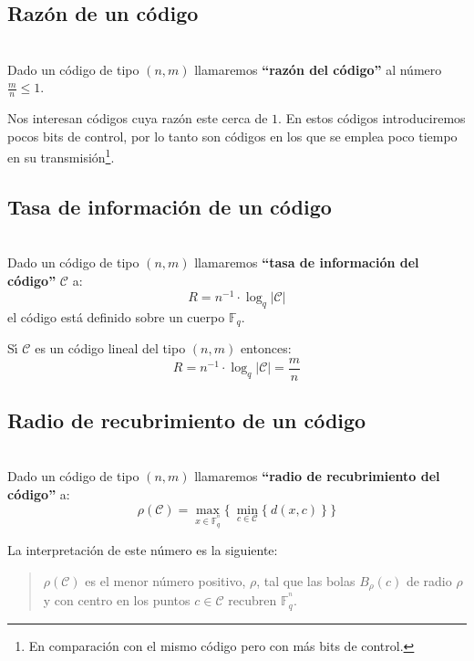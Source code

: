\subsection{Raz\'on de un c\'odigo}

\begin{definicion}
\ \\
Dado un c\'odigo de tipo $(n,m)$ llamaremos \textbf{``raz\'on del c\'odigo''}
al n\'umero $\frac{m}{n}\leq 1$.
\end{definicion}
%
Nos interesan c\'odigos cuya raz\'on este cerca de $1$. En estos c\'odigos
introduciremos pocos bits de control, por lo tanto son c\'odigos en los que
se emplea poco tiempo en su transmisi\'on\footnote{En comparaci\'on con el
mismo c\'odigo pero con m\'as bits de control.}.

\subsection{Tasa de informaci\'on de un c\'odigo}

\begin{definicion}
\ \\
Dado un c\'odigo de tipo $(n,m)$ llamaremos \textbf{``tasa de informaci\'on del
c\'odigo''} $\mathcal{C}$ a:
\begin{displaymath}
R= n^{-1}\cdot \log_q |\mathcal{C}|
\end{displaymath}
el c\'odigo est\'a definido sobre un cuerpo $\mathbb{F}_q$.
\end{definicion}
S\'{\i} $\mathcal{C}$ es un c\'odigo lineal del tipo $(n,m)$ entonces:
\begin{displaymath}
R=n^{-1}\cdot \log_q |\mathcal{C}| = \frac{m}{n}
\end{displaymath}

\subsection{Radio de recubrimiento de un c\'odigo}

\begin{definicion}
\ \\
Dado un c\'odigo de tipo $(n,m)$ llamaremos \textbf{``radio de recubrimiento del
c\'odigo''} a:
\begin{displaymath}
\rho (\mathcal{C}) = \max_{x\in \mathbb{F}^{^n}_q}\{\ \min_{c\in \mathcal{C}}
\{\ d(x,c)\ \}\ \} 
\end{displaymath}
\end{definicion}
La interpretaci\'on de este n\'umero es la siguiente:
\begin{quote}
$\rho(\mathcal{C})$ es el menor n\'umero positivo, $\rho$, tal que las bolas
$B_{\rho}(c)$ de radio $\rho$ y con centro en los puntos $c\in \mathcal{C}$
recubren $\mathbb{F}^{^n}_q$.
\end{quote}
